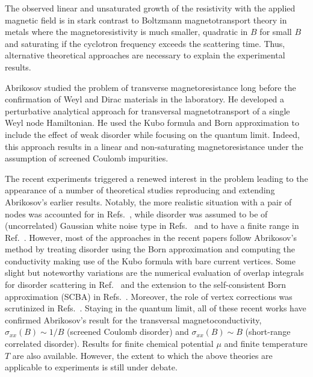 \documentclass[aps,prb,10pt,amsmath,amssymb,twocolumn,floatfix,superscriptaddress,showpacs,numerical,footinbib]{revtex4-1}
\begin{document}
The observed linear and unsaturated growth of the resistivity with the applied magnetic field is in stark contrast to Boltzmann magnetotransport theory in metals where the magnetoresistivity is much smaller, quadratic in $B$ for small $B$ and saturating if the cyclotron frequency exceeds the scattering time.
%
Thus, alternative theoretical approaches are necessary to explain the experimental results. 

Abrikosov studied the problem of transverse magnetoresistance long before the confirmation of Weyl and Dirac materials in the laboratory.
%
He developed a perturbative analytical approach for transversal magnetotransport of a single Weyl node Hamiltonian.\cite{Abrikosov1998}
%
He used the Kubo formula and Born approximation to include the effect of weak disorder while focusing on the quantum limit.
%
Indeed, this approach results in a linear and non-saturating magnetoresistance under the assumption of screened Coulomb impurities.

The recent experiments triggered a renewed interest in the problem
leading to the appearance of a number
of theoretical studies reproducing and extending Abrikosov's earlier results.\cite{Gorbar2014,Lu2015c,Klier2015,Zhang2016,Xiao2016,Klier2017,Ji2017,Cortijo:2016bq} Notably,
the more realistic situation with a pair of nodes was accounted
for in Refs.~, while disorder was
assumed to be of (uncorrelated) Gaussian white noise type
in Refs.~ and to have a finite range in Ref.~. However,
most of the approaches in the recent papers follow Abrikosov's method by treating disorder using the Born approximation and computing the conductivity making use of the Kubo formula with bare current vertices. Some slight but noteworthy variations are the numerical evaluation of overlap integrals for disorder scattering in Ref.~ and the extension to the self-consistent Born approximation (SCBA) in Refs.~. Moreover, the role of vertex corrections was scrutinized in Refs.~. 
Staying in the quantum limit, all of these recent works have confirmed Abrikosov's result for the transversal magnetoconductivity, $\sigma_{xx}(B)\sim1/B$ (screened Coulomb disorder) and $\sigma_{xx}(B)\sim B$ (short-range correlated disorder). 
Results for finite chemical
potential $\mu$ and finite temperature $T$ are also available.\cite{Xiao2016,Klier2017}
However, the extent to which the above theories are applicable to experiments is still under debate.\cite{Xiao2016}
\end{document}
